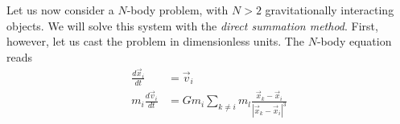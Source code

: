 Let us now consider a $N$-body problem, with $N>2$ gravitationally interacting
objects. We will solve this system with the \textit{direct summation method}.
First, however, let us cast the problem in dimensionless units. The $N$-body
equation reads
\begin{align}
    \frac{d\vec{x}_i}{dt}
    &=\vec{v}_i \\
    m_i\frac{d\vec{v}_i}{dt}
    &=Gm_i\sum_{k\neq i}m_l\frac{\vec{x}_k-\vec{x}_i}{|\vec{x}_k-\vec{x}_i|^3}
\end{align}
